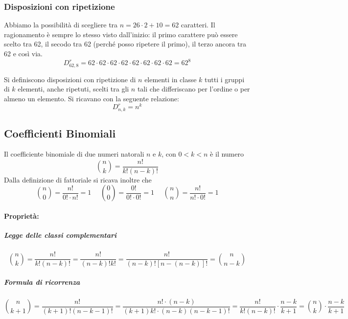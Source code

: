 \documentclass{article}     %
\begin{document}
            \subsubsection{Disposizioni con ripetizione}
            \begin{ex}

            Abbiamo la possibilità di scegliere tra $n=26\cdot2+10=62$ caratteri. Il ragionamento è sempre lo stesso visto dall'inizio: il primo carattere può essere scelto tra 62, il secodo tra 62 (perché posso ripetere il primo), il terzo ancora tra 62 e così via. 
            \[D_{62,8}^r=62\cdot62\cdot62\cdot62\cdot62\cdot62\cdot62\cdot62=62^8\]
        \end{ex} 
            \begin{boxdef}
                Si definiscono disposizioni con ripetizione di $n$ elementi in classe $k$  tutti i gruppi di $k$ elementi, anche ripetuti, scelti tra gli $n$ tali che differiscano per l'ordine o per almeno un elemento. Si ricavano con la seguente relazione: \[D^r_{n,k}=n^k\]
            \end{boxdef}
        \subsection{Coefficienti Binomiali}
            \begin{boxdef}
                Il coefficiente binomiale di due numeri natorali $n$ e $k$, con $0<k<n$ è il numero  \[\binom{n}{k}=\frac{n!}{k!(n-k)!}\]
                Dalla definizione di fattoriale si ricava inoltre che
                \[\binom{n}{0}=\frac{n!}{0!\cdot n!}=1 ~~~~~~ \binom{0}{0}=\frac{0!}{0!\cdot 0!}=1 ~~~~~~ \binom{n}{n}=\frac{n!}{n!\cdot 0!}=1\]
            \end{boxdef}
           
            
            \paragraph{Proprietà:}
                    \subparagraph{Legge delle classi complementari}
                        \[\binom{n}{k}=\frac{n!}{k!(n-k)!}=\frac{n!}{(n-k)!k!}=\frac{n!}{(n-k)![n-(n-k)]!}=\binom{n}{n-k}\]
                    \subparagraph{Formula di ricorrenza}
                        \[\binom{n}{k+1}=\frac{n!}{(k+1)!(n-k-1)!}=\frac{n!\cdot(n-k)}{(k+1)k!\cdot(n-k)(n-k-1)!}=\frac{n!}{k!(n-k)!}\cdot \frac{n-k}{k+1}=\binom{n}{k}\cdot \frac{n-k}{k+1}\]
        
\end{document}

